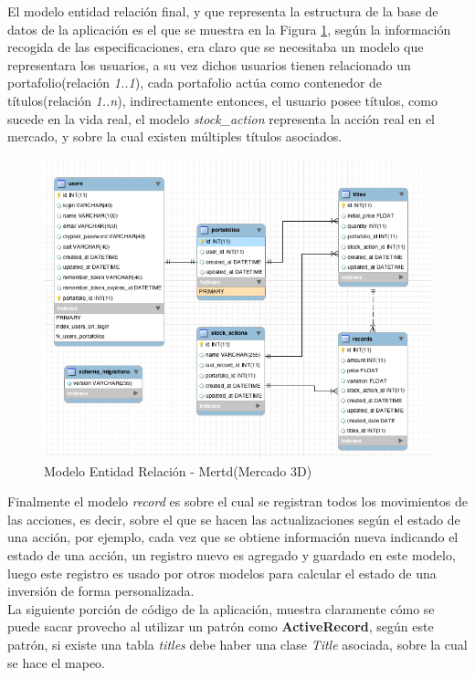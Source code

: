El modelo entidad relación final, y que representa la estructura de la base de datos de la aplicación es el que se muestra en la Figura \ref{fig:erd}, según la información recogida de las especificaciones, era claro que se necesitaba un modelo que representara los usuarios, a su vez dichos usuarios tienen relacionado un portafolio(relación \emph{1..1}), cada portafolio actúa como contenedor de títulos(relación \emph{1..n}), indirectamente entonces, el usuario posee títulos, como sucede en la vida real, el modelo \emph{stock\_action} representa la acción real en el mercado, y sobre la cual existen múltiples títulos asociados.

\begin{figure}[h]
	\centering
		\includegraphics[scale=0.5]{erb_mertd.jpg}
		\caption{Modelo Entidad Relación - Mertd(Mercado 3D)}
	\label{fig:erd}
\end{figure}

Finalmente el modelo \emph{record} es sobre el cual se registran todos los movimientos de las acciones, es decir, sobre el que se hacen las actualizaciones según el estado de una acción, por ejemplo, cada vez que se obtiene información nueva indicando el estado de una acción, un registro nuevo es agregado y guardado en este modelo, luego este registro es usado por otros modelos para calcular el estado de una inversión de forma personalizada.\\

La siguiente porción de código de la aplicación, muestra claramente cómo se puede sacar provecho al utilizar un patrón como \textbf{ActiveRecord}, según este patrón, si existe una tabla \emph{titles} debe haber una clase \emph{Title} asociada, sobre la cual se hace el mapeo.

